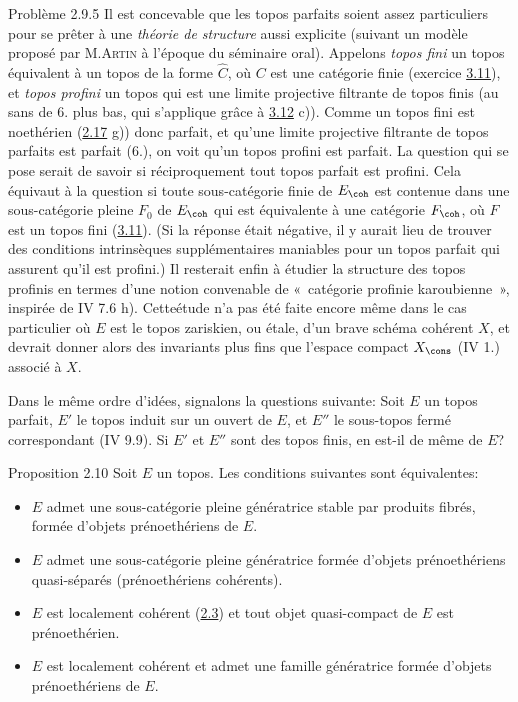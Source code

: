 \begin{enonce*}[remark]{Problème 2.9.5}
Il est concevable que les topos parfaits soient assez particuliers
pour se prêter à une \emph{théorie de structure} aussi explicite
(suivant un modèle proposé par M.\textsc{Artin} à l'époque du
séminaire oral). Appelons \emph{topos fini} un topos équivalent à un
topos de la forme $\widehat{C}$, où $C$  est une catégorie finie
(\cf exercice \hyperref[VI.exer3.11]{3.11}), et \emph{topos profini} un topos
qui est une limite projective filtrante de topos finis (au sans de
6. plus bas, qui s'applique grâce à \hyperref[VI.exer3.12]{3.12} c)). Comme un
topos fini est noethérien (\hyperref[VI.exer2.17]{2.17} g)) donc parfait, et
qu'une limite projective filtrante de topos parfaits est parfait
(6.), on voit qu'un topos profini est parfait. La question qui se
pose serait de savoir si réciproquement tout topos parfait est
profini. Cela équivaut à la question si toute sous-catégorie finie
de $E_{\coh}$ est contenue dans une sous-catégorie pleine $F_{0}$ de
$E_{\coh}$ qui est équivalente à une catégorie $F_{\coh}$, où
$F$ est un topos fini (\cf \hyperref[VI.exer3.11]{3.11}). (Si la réponse était
négative, il y aurait lieu de trouver des conditions intrinsèques
supplémentaires maniables pour un topos parfait qui assurent qu'il
est profini.) Il resterait enfin à étudier la structure des topos
profinis en termes d'une notion convenable de « catégorie profinie
karoubienne », inspirée de IV 7.6 h). Cette\pageoriginale étude
n'a pas été faite encore même dans le cas particulier
où $E$ est
le topos zariskien, ou étale, d'un brave schéma cohérent $X$, et
devrait donner alors des invariants plus fins que l'espace compact
$X_{\cons}$ (\EGA IV 1.) associé à $X$.

Dans le même ordre d'idées, signalons la questions suivante: Soit
$E$ un topos parfait, $E'$ le topos induit sur un ouvert de $E$, et
$E''$ le sous-topos fermé correspondant (IV 9.9). Si $E'$ et $E''$
sont des topos finis, en est-il de même de $E$?
\end{enonce*}

\begin{enonce*}{Proposition 2.10}
Soit $E$ un topos. Les conditions suivantes sont équivalentes:
\begin{itemize}
\item[(i)] $E$ admet une sous-catégorie pleine génératrice
  stable par
  produits fibrés, formée d'objets prénoethériens de $E$.

\item[(ii)] $E$ admet une sous-catégorie pleine
  génératrice formée d'objets
  prénoethériens quasi-séparés (\ie prénoethériens cohérents).

\item[(iii)] $E$ est localement cohérent (\hyperref[VI.def2.3]{2.3}) et tout objet quasi-compact de
  $E$ est prénoethérien.

\item[(iii bis)] $E$ est localement cohérent et admet une famille
  génératrice formée d'objets prénoethériens de $E$.
\end{itemize}
\end{enonce*}

